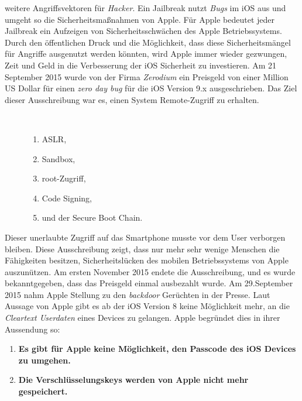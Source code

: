 weitere Angriffsvektoren für \textit{\glqq Hacker\grqq{}}.
Ein Jailbreak nutzt \textit{\glqq Bugs\grqq{}} im iOS aus und umgeht so die Sicherheitsmaßnahmen von Apple. Für Apple bedeutet jeder Jailbreak ein Aufzeigen von Sicherheitsschwächen des Apple Betriebssystems. Durch den öffentlichen Druck und die Möglichkeit, dass diese Sicherheitsmängel für Angriffe ausgenutzt werden könnten, wird Apple immer wieder gezwungen, Zeit und Geld in die Verbesserung der iOS Sicherheit zu investieren. 
Am 21 September 2015 wurde von der Firma \textit{\glqq Zerodium\grqq{}} ein Preisgeld von einer Million US Dollar für einen \textit{\glqq zero day bug\grqq{}} für die iOS Version 9.x ausgeschrieben. Das Ziel dieser Ausschreibung war es, einen System Remote-Zugriff zu erhalten. 
\begin{description}
    \item[\parbox{\textwidth} {Folgende iOS Sicherheitsmechanismen mussten durch diesen Jailbreak umgangen werden}]~\par
    \begin{enumerate}
        \item ASLR, 
        \item Sandbox,
        \item root-Zugriff, 
        \item Code Signing, 
        \item und der Secure Boot Chain.
    \end{enumerate}
\end{description} 
Dieser unerlaubte Zugriff auf das Smartphone musste vor dem User verborgen bleiben. Diese Ausschreibung zeigt, dass nur mehr sehr wenige Menschen die Fähigkeiten besitzen, Sicherheitslücken des mobilen Betriebssystems von Apple auszunützen. Am ersten November 2015 endete die Ausschreibung, und es wurde bekanntgegeben, dass das Preisgeld einmal ausbezahlt wurde. 
Am 29.September 2015 nahm Apple Stellung  zu den \textit{\glqq backdoor\grqq{}} Gerüchten in der Presse. Laut Aussage von Apple gibt es ab der iOS Version 8 keine Möglichkeit mehr, an die \textit{\glqq Cleartext Userdaten\grqq{}} eines Devices zu gelangen. Apple begründet dies in ihrer Aussendung so:
\begin{enumerate}
    \item \textbf{Es gibt für Apple keine Möglichkeit, den Passcode des iOS Devices zu umgehen.}
    \item \textbf{Die Verschlüsselungskeys werden von Apple nicht mehr gespeichert.}
\end{enumerate}
